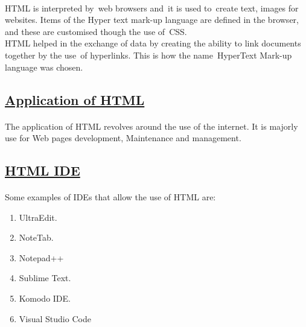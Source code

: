 \documentclass[[12pt]{article}
\begin{document}
	\paragraph{}
	HTML is interpreted by web browsers and it is used to create text, images for websites. Items of the Hyper text mark-up language are defined in the browser, and these are customised though the use of CSS.\\	
	HTML helped in the exchange of data by creating the ability to link documents together by the use of hyperlinks. This is how the name HyperText Mark-up language was chosen.	
	\subsection*{\underline{Application of HTML}}
	\paragraph{}
	The application of HTML revolves around the use of the internet. It is majorly use for Web pages development, Maintenance and management.\\
	
	\subsection*{\underline{HTML IDE}}
	\paragraph{}
		Some examples of IDEs that allow the use of HTML are:
	\begin{enumerate}
			\item 	UltraEdit.
		\item 	NoteTab.
		\item 	Notepad++
		\item 	Sublime Text.
		\item 	Komodo IDE.
		\item 	Visual Studio Code
		
	\end{enumerate}

	\newpage
\end{document}
